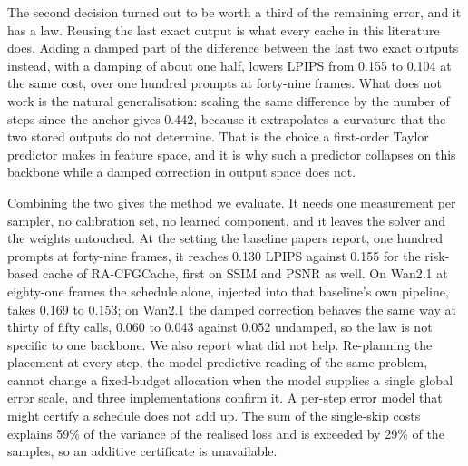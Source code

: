 The second decision turned out to be worth a third of the remaining error, and it has a law. Reusing the last exact output is what every cache in this literature does. Adding a damped part of the difference between the last two exact outputs instead, with a damping of about one half, lowers LPIPS from 0.155 to 0.104 at the same cost, over one hundred prompts at forty-nine frames. What does not work is the natural generalisation: scaling the same difference by the number of steps since the anchor gives 0.442, because it extrapolates a curvature that the two stored outputs do not determine. That is the choice a first-order Taylor predictor makes in feature space, and it is why such a predictor collapses on this backbone while a damped correction in output space does not.

Combining the two gives the method we evaluate. It needs one measurement per sampler, no calibration set, no learned component, and it leaves the solver and the weights untouched. At the setting the baseline papers report, one hundred prompts at forty-nine frames, it reaches 0.130 LPIPS against 0.155 for the risk-based cache of RA-CFGCache, first on SSIM and PSNR as well. On Wan2.1 at eighty-one frames the schedule alone, injected into that baseline's own pipeline, takes 0.169 to 0.153; on Wan2.1 the damped correction behaves the same way at thirty of fifty calls, 0.060 to 0.043 against 0.052 undamped, so the law is not specific to one backbone. We also report what did not help. Re-planning the placement at every step, the model-predictive reading of the same problem, cannot change a fixed-budget allocation when the model supplies a single global error scale, and three implementations confirm it. A per-step error model that might certify a schedule does not add up. The sum of the single-skip costs explains 59\% of the variance of the realised loss and is exceeded by 29\% of the samples, so an additive certificate is unavailable.
